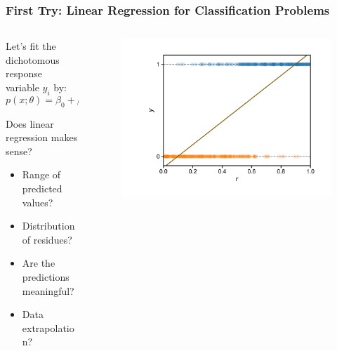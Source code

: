 \documentclass[10pt,aspectratio=169]{beamer}
\begin{document}
\begin{frame}
  \frametitle{First Try: Linear Regression for Classification Problems}
  \begin{columns}[T]
    \begin{column}{0.350\textwidth}
      Let's fit the dichotomous response variable $y_{i}$ by:
  \begin{equation*}
    p(x; \theta) = \beta_{0} + \beta_{1} x
  \end{equation*}

  Does linear regression makes sense?
  \begin{itemize}
  \item Range of predicted values?
  \item Distribution of residues?
  \item Are the predictions meaningful?
  \item Data extrapolation?
  \end{itemize}
\end{column}

\begin{column}{0.65\textwidth}
  \begin{figure}[t]
    \includegraphics[width=1.1\textwidth]{scripts/coin_linear_fit.pdf}
  \end{figure}
\end{column}
  \end{columns}
\end{frame}
\end{document}
